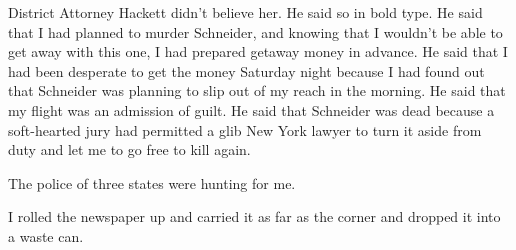 {District Attorney Hackett didn’t believe her. He said so in bold type. He said that I had planned to murder Schneider, and knowing that I wouldn’t be able to get away with this one, I had prepared getaway money in advance. He said that I had been desperate to get the money Saturday night because I had found out that Schneider was planning to slip out of my reach in the morning. He said that my flight was an admission of guilt. He said that Schneider was dead because a soft-hearted jury had permitted a glib New York lawyer to turn it aside from duty and let me to go free to kill again.

The police of three states were hunting for me.

I rolled the newspaper up and carried it as far as the corner and dropped it into a waste can.

}

\vspace{2\nbs}
\clearpage
\thispagestyle{empty}


